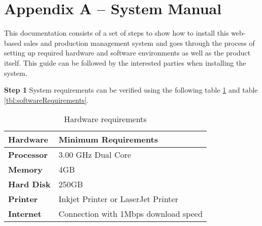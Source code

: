 \documentclass[12pt]{report}
\begin{document}

\renewcommand\thechapter{\Alph{chapter}}
\renewcommand\thesection{\thechapter.\arabic{section}}

\setcounter{chapter}{1}
\setcounter{section}{0}
\setcounter{figure}{0}
\chapter*{Appendix A – System Manual}
This documentation consists of a set of steps to show how to install this web-based sales and production management system and goes through the process of setting up required hardware and software environments as well as the product itself. This guide can be followed by the interested parties when installing the system.

\noindent
{\large{\bf{Step 1}}}\newline
System requirements can be verified using the following table \ref{tbl:hardwareRequirements} and table \ref{tbl:softwareRequirements}.

\begin{table}[H]
	\centering
	\begin{tabular}{ | p{2.5cm} | p{8.5cm} |}
		\hline
		\bf{Hardware}  & \bf{Minimum Requirements}            \\
		\hline
		\bf{Processor} & 3.00 GHz Dual Core                   \\
		\hline
		\bf{Memory}    & 4GB                                  \\
		\hline
		\bf{Hard Disk} & 250GB                                \\
		\hline
		\bf{Printer}   & Inkjet Printer or LaserJet Printer   \\
		\hline
		\bf{Internet}  & Connection with 1Mbps download speed \\
		\hline
	\end{tabular}
	\caption{Hardware requirements}
	\label{tbl:hardwareRequirements}
\end{table}
\end{document}
